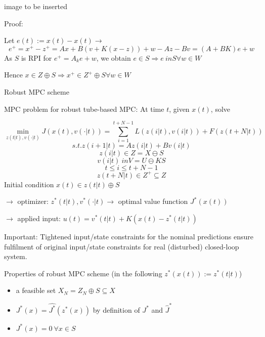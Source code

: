 image to be inserted

Proof:

Let $e(t) := x(t) - x(t) \rightarrow$
\begin{equation*}
e^+ = x^+ - z^+ = Ax + B(v + K(x-z)) + w - Az - Bv = (A+BK)e + w
\end{equation*}
As $S$ is RPI for $e^+ = A_ke + w$, we obtain $e \in S \Rightarrow e \ in S \forall w \in W$

Hence $x \in Z \oplus S \Rightarrow x^+ \in Z^+ \oplus S \forall w \in W$

Robust MPC scheme 

MPC problem for robust tube-based MPC: At time $t$, given $x(t)$, solve 

\begin{equation*}
\min_{z(t|t), v(\cdot|t)} J(x(t),v(\cdot|t)) = \sum_{i = 1}^{t+ N -1}L(z(i|t), v(i|t)) + F(z(t+N|t))
\end{equation*}
\begin{equation*}
s.t. z(i+1|t) = Az(i|t) + Bv(i|t)
\end{equation*}  
\begin{equation*}
z(i|t) \in Z = X \ominus S 
\end{equation*}
\begin{equation*}
v(i|t) \ in V = U \ominus KS
\end{equation*}
\begin{equation*}
t \leq i \leq t + N -1
\end{equation*}
\begin{equation*}
z(t+N|t) \in Z^+ \subseteq Z 
\end{equation*}
Initial condition $x(t) \in z(t|t) \oplus S$

$\rightarrow$ optimizer: $z^*(t|t), v^*(\cdot|t) \rightarrow$ optimal value function $J^*(x(t))$

$\rightarrow$ applied input: $u(t) = v^*(t|t) + K(x(t) - z^*(t|t))$

Important: Tightened input/state constraints for the nominal predictions ensure fulfilment of original input/state constraints for real (disturbed) closed-loop system.

Properties of robust MPC scheme (in the following $z^*(x(t)):=z^*(t|t)$)
\begin{itemize}
\item a feasible set $X_N = Z_N \oplus S \subseteq X$
\item $J^*(x) = \hat{J^*}(z^*(x))$ by definition of $J^*$ and $\hat J^*$
\item $J^*(x) = 0 \ \forall x \in S$
\end{itemize}    

